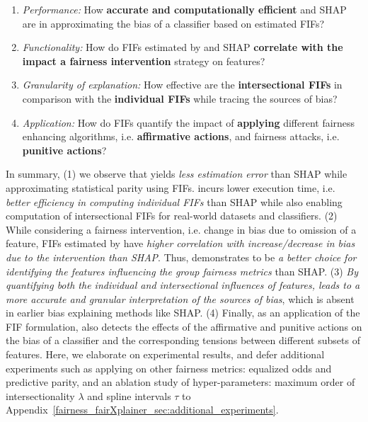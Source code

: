 \begin{enumerate}
	\item \textit{Performance:} How \textbf{accurate and computationally efficient} {\fairXplainer} and SHAP are in approximating the bias of a classifier based on estimated FIFs?
	\item \textit{Functionality:} How do FIFs estimated by {\fairXplainer} and SHAP \textbf{correlate with the impact a fairness intervention} strategy on features?
	\item \textit{Granularity of explanation:} How effective are the \textbf{ intersectional FIFs} in comparison with the \textbf{individual FIFs} while tracing the sources of bias?
	\item \textit{Application:} How do FIFs quantify the impact of \textbf{applying} different fairness enhancing algorithms, i.e. \textbf{affirmative actions}, and fairness attacks, i.e. \textbf{punitive actions}?
\end{enumerate}

In summary, (1) we observe that {\fairXplainer} yields \textit{less estimation error} than SHAP while approximating statistical parity using FIFs. {\fairXplainer} incurs lower execution time, i.e. \textit{better efficiency in computing individual FIFs} than SHAP while also enabling computation of intersectional FIFs for real-world datasets and classifiers. (2) While considering a fairness intervention, i.e. change in bias due to omission of a feature, FIFs estimated by {\fairXplainer} have \textit{higher correlation with increase/decrease in bias due to  the intervention than SHAP}. %
Thus, {\fairXplainer} demonstrates to be \textit{a better choice for identifying the features influencing the group fairness metrics} than SHAP. 
(3) \textit{By quantifying both the individual and intersectional influences of features, \fairXplainer{} leads to a more accurate and granular interpretation of the sources of bias}, which is absent in earlier bias explaining methods like SHAP. (4) Finally, as an application of the FIF formulation, {\fairXplainer} also detects the effects of the affirmative and punitive actions on the bias of a classifier and the corresponding tensions between different subsets of features.  Here, we elaborate on experimental results, and defer additional experiments such as applying {\fairXplainer} on other fairness metrics: equalized odds and predictive parity, and an ablation study of hyper-parameters: maximum order of intersectionality  $ \lambda $ and spline intervals $ \tau $ to Appendix~\ref{fairness_fairXplainer_sec:additional_experiments}.

